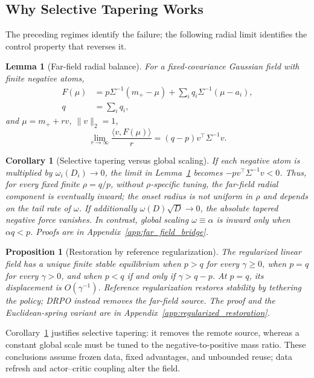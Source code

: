 \documentclass{article}
\theoremstyle{plain}
\newtheorem{proposition}[theorem]{Proposition}
\newtheorem{lemma}[theorem]{Lemma}
\newtheorem{corollary}[theorem]{Corollary}
\theoremstyle{definition}
\theoremstyle{remark}
\begin{document}
\subsection{Why Selective Tapering Works}
\label{sec:selective_tapering_bridge}

The preceding regimes identify the failure; the following radial limit
identifies the control property that reverses it.

\begin{lemma}[Far-field radial balance]
\label{lem:far_field_radial_balance}
For a fixed-covariance Gaussian field with finite negative atoms,
\[
\begin{aligned}
F(\mu)&=p\Sigma^{-1}(m_+-\mu)
 +\sum_iq_i\Sigma^{-1}(\mu-a_i),\\
q&=\sum_iq_i,
\end{aligned}
\]
and \(\mu=m_++rv\), \(\|v\|_2=1\),
\[
\lim_{r\to\infty}\frac{\langle v,F(\mu)\rangle}{r}
=(q-p)v^\top\Sigma^{-1}v.
\]
\end{lemma}

\begin{corollary}[Selective tapering versus global scaling]
\label{cor:selective_vs_global}
If each negative atom is multiplied by
\(\omega_i(D_i)\to0\), the limit in
Lemma~\ref{lem:far_field_radial_balance} becomes
\(-p v^\top\Sigma^{-1}v<0\). Thus, for every fixed finite
\(\rho=q/p\), without \(\rho\)-specific tuning, the far-field radial
component is eventually inward; the onset radius is not uniform in
\(\rho\) and depends on the tail rate of \(\omega\). If additionally
\(\omega(D)\sqrt D\to0\), the absolute tapered negative force vanishes.
In contrast, global scaling \(\omega\equiv\alpha\) is inward only when
\(\alpha q<p\). Proofs are in Appendix~\ref{app:far_field_bridge}.
\end{corollary}

\begin{proposition}[Restoration by reference regularization]
\label{prop:regularized_restoration}
The regularized linear field has a unique finite stable equilibrium when
\(p>q\) for every \(\gamma\ge0\), when \(p=q\) for every \(\gamma>0\),
and when \(p<q\) if and only if \(\gamma>q-p\). At \(p=q\), its
displacement is \(O(\gamma^{-1})\). Reference regularization restores
stability by tethering the policy; DRPO instead removes the far-field
source. The proof and the Euclidean-spring variant are in
Appendix~\ref{app:regularized_restoration}.
\end{proposition}

Corollary~\ref{cor:selective_vs_global} justifies selective tapering: it
removes the remote source, whereas a constant global scale must be tuned to
the negative-to-positive mass ratio. These conclusions assume frozen data,
fixed advantages, and unbounded reuse; data refresh and actor--critic
coupling alter the field.
\end{document}
